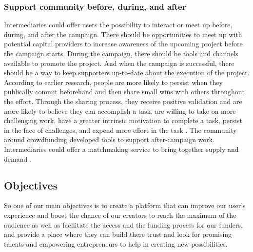 \subsubsection*{Support community before, during, and after}
Intermediaries could offer users the possibility to interact or meet up before, during, and after the campaign.
There should be opportunities to meet up with potential capital providers to increase awareness of the upcoming project before the campaign starts. During the campaign, there should be tools and channels available to promote the project. And when the campaign is successful, there should be a way to keep supporters
up-to-date about the execution of the project.
According to earlier research, people are more likely to persist when they publically commit beforehand
and then share small wins with others throughout the effort.
Through the sharing process, they receive positive validation and are more likely to believe they can
accomplish a task, are willing to take on more challenging work, have a greater intrinsic motivation 
to complete a task, persist in the face of challenges, and expend
more effort in the task \cite{crowdMotiv}.
The community around crowdfunding developed tools to support after-campaign work. Intermediaries could offer a matchmaking
service to bring together supply and demand \cite{doi:10.5465/ambpp.2014.209}.

\subsection{Objectives}

So one of our main objectives is to create a platform that can improve our user's experience and boost the chance of our creators to reach the maximum of the audience as well as facilitate the access and the funding process for our funders, and provide a place where they can build there trust and look for promising talents and empowering entrepreneurs to help in creating new possibilities.

